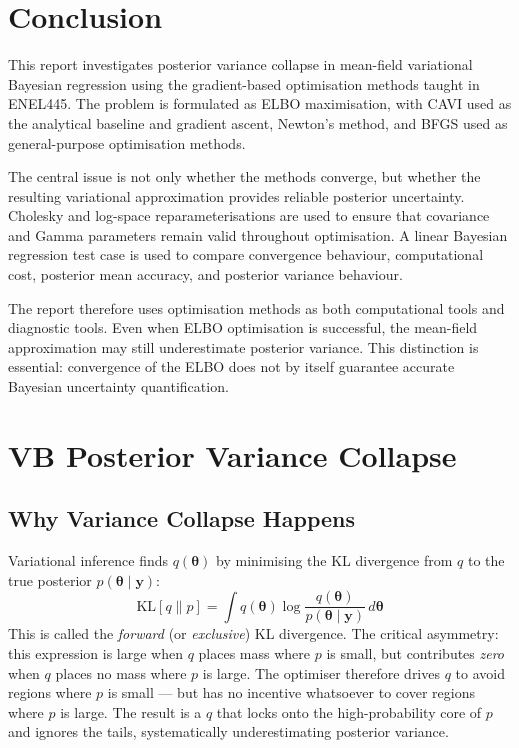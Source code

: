 \documentclass[11pt,a4paper]{article}
\begin{document}
\section{Conclusion}

This report investigates posterior variance collapse in mean-field variational Bayesian regression using the gradient-based optimisation methods taught in ENEL445. The problem is formulated as ELBO maximisation, with CAVI used as the analytical baseline and gradient ascent, Newton's method, and BFGS used as general-purpose optimisation methods.

The central issue is not only whether the methods converge, but whether the resulting variational approximation provides reliable posterior uncertainty. Cholesky and log-space reparameterisations are used to ensure that covariance and Gamma parameters remain valid throughout optimisation. A linear Bayesian regression test case is used to compare convergence behaviour, computational cost, posterior mean accuracy, and posterior variance behaviour.

The report therefore uses optimisation methods as both computational tools and diagnostic tools. Even when ELBO optimisation is successful, the mean-field approximation may still underestimate posterior variance. This distinction is essential: convergence of the ELBO does not by itself guarantee accurate Bayesian uncertainty quantification.

\newpage
\nocite{*}
\printbibliography
\setcounter{secnumdepth}{1}
\appendix
\renewcommand{\thesection}{Appendix~\Alph{section}}

\newpage
\section{VB Posterior Variance Collapse}
\label{app:vb-collapse}

\subsection*{Why Variance Collapse Happens}

Variational inference finds $q(\bm{\theta})$ by minimising the KL divergence from $q$ to the true posterior $p(\bm{\theta}\mid\bm{y})$:
\begin{equation}
  \mathrm{KL}[q \| p] = \int q(\bm{\theta}) \log \frac{q(\bm{\theta})}{p(\bm{\theta}\mid\bm{y})} \, d\bm{\theta}
\end{equation}
This is called the \emph{forward} (or \emph{exclusive}) KL divergence. The critical asymmetry: this expression is large when $q$ places mass where $p$ is small, but contributes \emph{zero} when $q$ places no mass where $p$ is large. The optimiser therefore drives $q$ to avoid regions where $p$ is small --- but has no incentive whatsoever to cover regions where $p$ is large. The result is a $q$ that locks onto the high-probability core of $p$ and ignores the tails, systematically underestimating posterior variance.
\end{document}
